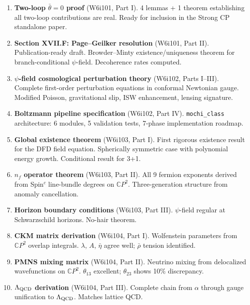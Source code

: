 \documentclass[11pt,a4paper]{article}
\newcommand{\CP}{\mathbb{C}P}
\begin{document}
\begin{enumerate}
\item \textbf{Two-loop $\bar\theta = 0$ proof} (W6i101, Part I).
  4 lemmas + 1 theorem establishing all two-loop contributions are real.
  Ready for inclusion in the Strong CP standalone paper.

\item \textbf{Section XVII.F: Page--Geilker resolution} (W6i101, Part II).
  Publication-ready draft. Browder--Minty existence/uniqueness theorem
  for branch-conditional $\psi$-field. Decoherence rates computed.

\item \textbf{$\psi$-field cosmological perturbation theory} (W6i102, Parts I--III).
  Complete first-order perturbation equations in conformal Newtonian gauge.
  Modified Poisson, gravitational slip, ISW enhancement, lensing signature.

\item \textbf{Boltzmann pipeline specification} (W6i102, Part IV).
  \texttt{mochi\_class} architecture: 6 modules, 5 validation tests,
  7-phase implementation roadmap.

\item \textbf{Global existence theorem} (W6i103, Part I).
  First rigorous existence result for the DFD field equation. Spherically
  symmetric case with polynomial energy growth. Conditional result for 3+1.

\item \textbf{$n_f$ operator theorem} (W6i103, Part II).
  All 9 fermion exponents derived from Spin$^c$ line-bundle degrees on $\CP^2$.
  Three-generation structure from anomaly cancellation.

\item \textbf{Horizon boundary conditions} (W6i103, Part III).
  $\psi$-field regular at Schwarzschild horizons. No-hair theorem.

\item \textbf{CKM matrix derivation} (W6i104, Part I).
  Wolfenstein parameters from $\CP^2$ overlap integrals. $\lambda$, $A$,
  $\bar\eta$ agree well; $\bar\rho$ tension identified.

\item \textbf{PMNS mixing matrix} (W6i104, Part II).
  Neutrino mixing from delocalized wavefunctions on $\CP^2$.
  $\theta_{13}$ excellent; $\theta_{23}$ shows 10\% discrepancy.

\item \textbf{$\Lambda_{\rm QCD}$ derivation} (W6i104, Part III).
  Complete chain from $\alpha$ through gauge unification to $\Lambda_{\rm QCD}$.
  Matches lattice QCD.


\end{enumerate}
\end{document}
